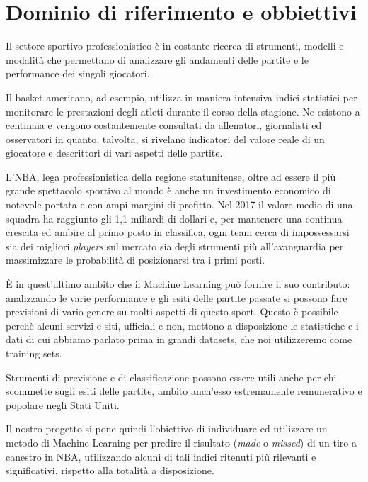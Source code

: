 \section{Dominio di riferimento e obbiettivi}
Il settore sportivo professionistico è in costante ricerca di strumenti, modelli e modalità che permettano di analizzare gli andamenti delle partite e le performance dei singoli giocatori.

Il basket americano, ad esempio, utilizza in maniera intensiva indici statistici per monitorare le prestazioni degli atleti durante il corso della stagione. Ne esistono a centinaia e vengono costantemente consultati da allenatori, giornalisti ed osservatori in quanto, talvolta, si rivelano indicatori del valore reale di un giocatore e descrittori di vari aspetti delle partite.
\par
L’NBA, lega professionistica della regione statunitense, oltre ad essere il più grande spettacolo sportivo al mondo è anche un investimento economico di notevole portata e con ampi margini di profitto. Nel 2017 il valore medio di una squadra ha raggiunto gli 1,1 miliardi di dollari e, per mantenere una continua crescita ed ambire al primo posto in classifica, ogni team cerca di impossessarsi sia dei migliori \textit{players} sul mercato sia degli strumenti più all’avanguardia per massimizzare le probabilità di posizionarsi tra i primi posti.
\par
È in quest’ultimo ambito che il Machine Learning può fornire il suo contributo: analizzando le varie performance e gli esiti delle partite passate si possono fare previsioni di vario genere su molti aspetti di questo sport. 
Questo è possibile perchè alcuni servizi e siti, ufficiali e non, mettono a disposizione le statistiche e i dati di cui abbiamo parlato prima in grandi datasets, che noi utilizzeremo come training sets.
\par
Strumenti di previsione e di classificazione possono essere utili anche per chi scommette sugli esiti delle partite, ambito anch’esso estremamente remunerativo e popolare negli Stati Uniti.
\par
Il nostro progetto si pone quindi l'obiettivo di individuare ed utilizzare un metodo di Machine Learning per predire il risultato (\textit{made} o \textit{missed}) di un tiro a canestro in NBA, utilizzando alcuni di tali indici ritenuti più rilevanti e significativi, rispetto alla totalità a disposizione.
